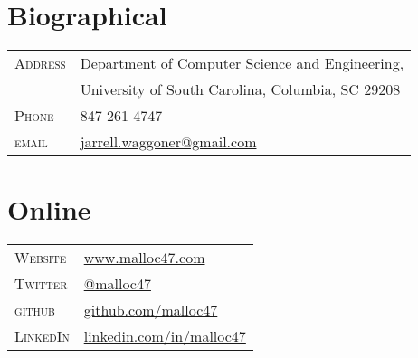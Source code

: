 \documentclass[10pt]{article}
\begin{document}
\pagestyle{empty}


\par{\bigskip\par}



\begin{multicols}{2}
\setlength{\parskip}{0pt}
  \section{Biographical}

\begin{tabularx}{\linewidth}{@{}l X@{}}
  \textsc{Address}	& \footnotesize{Department of Computer Science and Engineering,} \\
  & \footnotesize{University of South Carolina, Columbia, SC 29208} \\
  \textsc{Phone}       & 847-261-4747\\
  \textsc{email}       & \href{mailto:jarrell.waggoner@gmail.com}{jarrell.waggoner@gmail.com} \\
\end{tabularx}

\vfill
\columnbreak

\section{Online}
\begin{tabularx}{\linewidth}{@{}l X@{}}
  \textsc{Website}	& \href{http://www.malloc47.com}{www.malloc47.com} \\
  \textsc{Twitter}     & \href{https://twitter.com/malloc47}{@malloc47} \\
  \textsc{github}      & \href{http://www.github.com/malloc47}{github.com/malloc47}\\
  \textsc{LinkedIn}    & \href{http://www.linkedin.com/in/malloc47}{linkedin.com/in/malloc47} \\
\end{tabularx}

\end{multicols}
\end{document}
